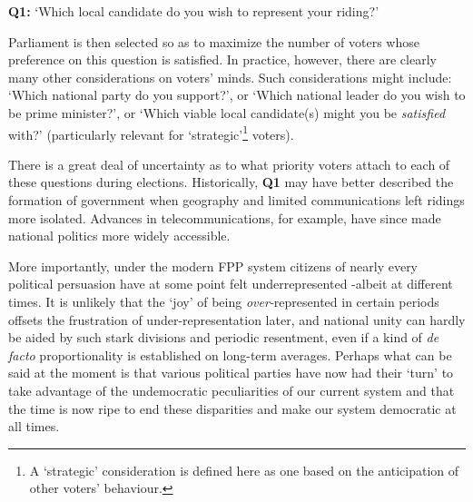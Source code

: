 \documentclass[DIV=calc, paper=a4, fontsize=11pt, twocolumn]{scrartcl}	 %
\begin{document}
\begin{tcolorbox}[colback=white!5!white,colframe=blue!55!black]
{\textbf{Q1:} } `Which local candidate do you wish to represent your riding?'
\end{tcolorbox}

Parliament is then selected so as to maximize the number of voters whose preference on this question is satisfied.
In practice, however, there are clearly many other considerations on voters' minds. 
Such considerations might include: `Which national party do you support?', or `Which national leader do you wish to be prime minister?', or `Which viable local candidate(s) might you be \emph{satisfied} with?' (particularly relevant for `strategic'\footnote{A `strategic'  consideration is defined here as one based on the anticipation of other voters' behaviour.} voters). 

There is a great deal of uncertainty as to what priority voters attach to each of these questions during elections. Historically, \textbf{Q1} may have better described the formation of government when geography and limited communications left ridings more isolated.
Advances in telecommunications, for example, have since made national politics more widely accessible. 



More importantly, under the modern FPP system citizens of nearly every political persuasion have at some point felt underrepresented \--albeit at different times. It is unlikely that the `joy' of being \emph{over-}represented in certain periods offsets the frustration of under-representation later, and
 national unity can hardly be aided by such stark divisions and periodic resentment, even if a kind of \emph{ de facto} proportionality is established on long-term averages. 
Perhaps what can be said at the moment is that various political parties have now had their `turn' to take advantage of the undemocratic peculiarities of our current system and that the time is now ripe to end these disparities and make our system democratic at all times. 
\end{document}
